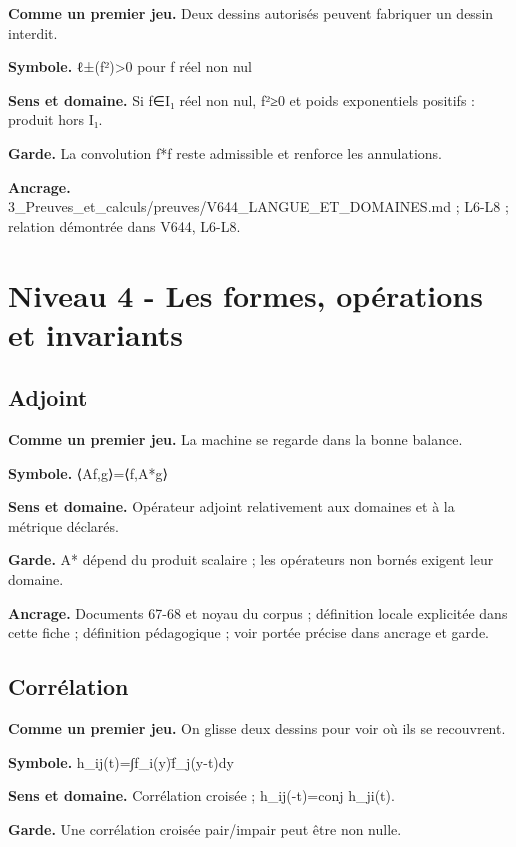 \documentclass[
  9pt,
  a4paper,
]{article}
\begin{document}
\textbf{Comme un premier jeu.} Deux dessins autorisés peuvent fabriquer
un dessin interdit.

\textbf{Symbole.} ℓ±(f²)\textgreater0 pour f réel non nul

\textbf{Sens et domaine.} Si f∈I₁ réel non nul, f²≥0 et poids
exponentiels positifs : produit hors I₁.

\textbf{Garde.} La convolution f*f reste admissible et renforce les
annulations.

\textbf{Ancrage.}
3\_Preuves\_et\_calculs/preuves/V644\_LANGUE\_ET\_DOMAINES.md ; L6-L8 ;
relation démontrée dans V644, L6-L8.

\hypertarget{niveau-4---les-formes-opuxe9rations-et-invariants}{%
\section{Niveau 4 - Les formes, opérations et
invariants}\label{niveau-4---les-formes-opuxe9rations-et-invariants}}

\hypertarget{adjoint}{%
\subsection{Adjoint}\label{adjoint}}

\textbf{Comme un premier jeu.} La machine se regarde dans la bonne
balance.

\textbf{Symbole.} ⟨Af,g⟩=⟨f,A*g⟩

\textbf{Sens et domaine.} Opérateur adjoint relativement aux domaines et
à la métrique déclarés.

\textbf{Garde.} A* dépend du produit scalaire ; les opérateurs non
bornés exigent leur domaine.

\textbf{Ancrage.} Documents 67-68 et noyau du corpus ; définition locale
explicitée dans cette fiche ; définition pédagogique ; voir portée
précise dans ancrage et garde.

\hypertarget{corruxe9lation}{%
\subsection{Corrélation}\label{corruxe9lation}}

\textbf{Comme un premier jeu.} On glisse deux dessins pour voir où ils
se recouvrent.

\textbf{Symbole.} h\_ij(t)=∫f\_i(y)f̄\_j(y-t)dy

\textbf{Sens et domaine.} Corrélation croisée ; h\_ij(-t)=conj h\_ji(t).

\textbf{Garde.} Une corrélation croisée pair/impair peut être non nulle.
\end{document}
